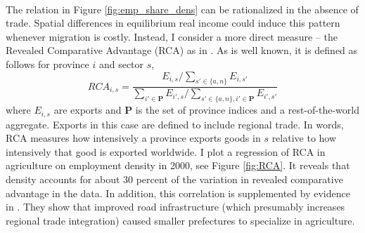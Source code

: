 \documentclass[]{article}
\theoremstyle{plain}
\begin{document}
\paragraph*{}
The relation in Figure \ref{fig:emp_share_dens} can be rationalized in the absence of trade. Spatial differences in equilibrium real income could induce this pattern whenever migration is costly. Instead, I consider a more direct measure -- the Revealed Comparative Advantage (RCA) as in \cite{balassa}. As is well known, it is defined as follows for province $i$ and sector $s$, 
\begin{equation*}
	RCA_{i, s} = \frac{E_{i, s}/\sum_{s' \in \{a, n\}}E_{i, s'}}{\sum_{i' \in \mathbf{P}}E_{i', s}/\sum_{s' \in \{a, n\}, i' \in \mathbf{P}}E_{i', s'}}
\end{equation*} 
where $E_{i, s}$ are exports and $\mathbf{P}$ is the set of province indices and a rest-of-the-world aggregate. Exports in this case are defined to include regional trade. In words, RCA measures how intensively a province exports goods in $s$ relative to how intensively that good is exported worldwide. I plot a regression of RCA in agriculture on employment density in 2000, see Figure \ref{fig:RCA}. It reveals that density accounts for about 30 percent of the variation in revealed comparative advantage in the data. In addition, this correlation is supplemented by evidence in \cite{bsetal2020}. They show that improved road infrastructure (which presumably increases regional trade integration) caused smaller prefectures to specialize in agriculture.
\end{document}
